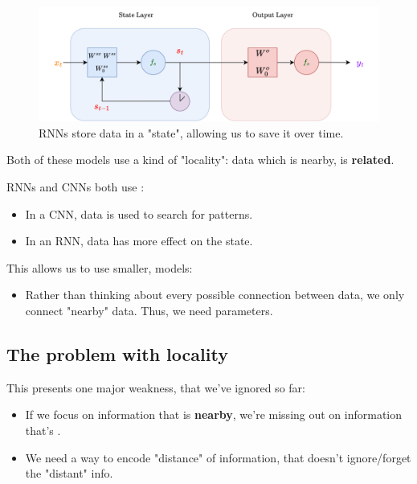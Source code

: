 \begin{itemize}
        \begin{figure}[H]
          \centering
          \includegraphics[width=0.8\linewidth]{images/rnn_images/rnn_full.png}
          \caption*{RNNs store data in a "state", allowing us to save it over time.}
        \end{figure}
    \end{itemize}

    Both of these models use a kind of "locality": data which is nearby, is \textbf{related}.\\

    \begin{concept}
        RNNs and CNNs both use :

        \begin{itemize}
            \item In a CNN,  data is used to search for patterns.
            \item In an RNN,  data has more effect on the state.
        \end{itemize}

        This allows us to use smaller,  models:

        \begin{itemize}
            \item Rather than thinking about every possible connection between data, we only connect "nearby" data. Thus, we need  parameters.
        \end{itemize}
    \end{concept}




\phantom{}

\subsection{The problem with locality}

    This presents one major weakness, that we've ignored so far:

    \begin{itemize}
        \item If we focus on information that is \textbf{nearby}, we're missing out on information that's .

        \item We need a way to encode "distance" of information, that doesn't ignore/forget the "distant" info.\\
    \end{itemize}

